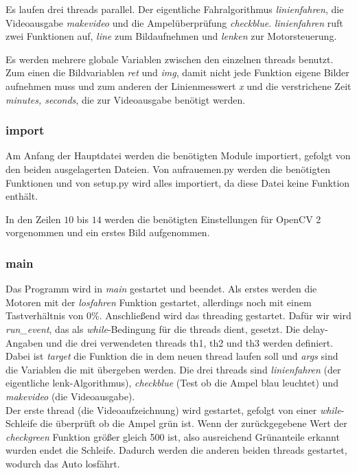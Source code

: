 \documentclass[a4paper, 12pt]{scrartcl}
\begin{document}
Es laufen drei threads parallel. Der eigentliche Fahralgorithmus \textit{linienfahren}, die Videoausgabe \textit{makevideo} und die Ampelüberprüfung \textit{checkblue}. \textit{linienfahren} ruft zwei Funktionen auf, \textit{line} zum Bildaufnehmen und \textit{lenken} zur Motorsteuerung.

Es werden mehrere globale Variablen zwischen den einzelnen threads benutzt. Zum einen die Bildvariablen \textit{ret} und \textit{img}, damit nicht jede Funktion eigene Bilder aufnehmen muss und zum anderen der Linienmesswert \textit{x} und die verstrichene Zeit \textit{minutes, seconds}, die zur Videoausgabe benötigt werden.


\subsubsection{import}	%


Am Anfang der Hauptdatei werden die benötigten Module importiert, gefolgt von den beiden ausgelagerten Dateien. Von aufrauemen.py werden die benötigten Funktionen und von setup.py wird alles importiert, da diese Datei keine Funktion enthält.

In den Zeilen $10$ bis $14$ werden die benötigten Einstellungen für OpenCV 2 vorgenommen und ein erstes Bild aufgenommen.

\newpage
\subsubsection{main}	%


Das Programm wird in \textit{main} gestartet und beendet. Als erstes werden die Motoren mit der \textit{losfahren} Funktion gestartet, allerdings noch mit einem Tastverhältnis von 0\%.
Anschließend wird das threading gestartet. Dafür wir wird \textit{run\_event}, das als \textit{while}-Bedingung für die threads dient, gesetzt. Die delay-Angaben und die drei verwendeten threads th1, th2 und th3 werden definiert. Dabei ist \textit{target} die Funktion die in dem neuen thread laufen soll und \textit{args} sind die Variablen die mit übergeben werden.
Die drei threads sind \textit{linienfahren} (der eigentliche lenk-Algorithmus), \textit{checkblue} (Test ob die Ampel blau leuchtet) und \textit{makevideo} (die Videoausgabe).\\

Der erste thread (die Videoaufzeichnung) wird gestartet, gefolgt von einer \textit{while}-Schleife die überprüft ob die Ampel grün ist. Wenn der zurückgegebene Wert der \textit{checkgreen} Funktion größer gleich 500 ist, also ausreichend Grünanteile erkannt wurden endet die Schleife. Dadurch werden die anderen beiden threads gestartet, wodurch das Auto losfährt.
\end{document}
